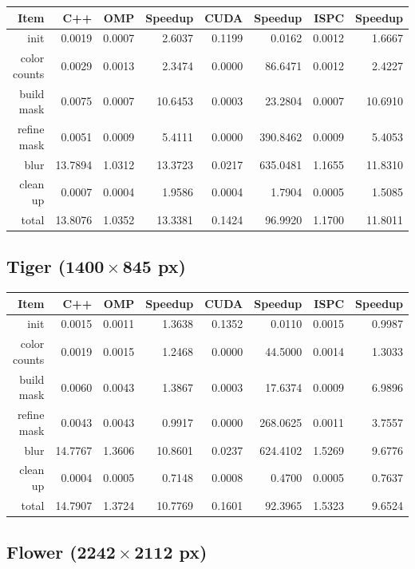 \documentclass[12pt]{article}
\begin{document}
\begin{tabular}{r|r|r|r|r|r|r|r}
    Item & C++ & OMP & Speedup & CUDA & Speedup & ISPC & Speedup
\\  \hline
    init & 0.0019 & 0.0007 & 2.6037 & 0.1199 & 0.0162 & 0.0012 & 1.6667
\\  color counts & 0.0029 & 0.0013 & 2.3474 & 0.0000 & 86.6471 & 0.0012 & 2.4227
\\  build mask & 0.0075 & 0.0007 & 10.6453 & 0.0003 & 23.2804 & 0.0007 & 10.6910
\\  refine mask & 0.0051 & 0.0009 & 5.4111 & 0.0000 & 390.8462 & 0.0009 & 5.4053
\\  blur & 13.7894 & 1.0312 & 13.3723 & 0.0217 & 635.0481 & 1.1655 & 11.8310
\\  clean up & 0.0007 & 0.0004 & 1.9586 & 0.0004 & 1.7904 & 0.0005 & 1.5085
\\  \hline
    total & 13.8076 & 1.0352 & 13.3381 & 0.1424 & 96.9920 & 1.1700 & 11.8011
\end{tabular}

\subsection{Tiger ($\mathbf{1400 \times 845}$ px)}

\begin{tabular}{r|r|r|r|r|r|r|r}
    Item & C++ & OMP & Speedup & CUDA & Speedup & ISPC & Speedup
\\  \hline
    init & 0.0015 & 0.0011 & 1.3638 & 0.1352 & 0.0110 & 0.0015 & 0.9987
\\  color counts & 0.0019 & 0.0015 & 1.2468 & 0.0000 & 44.5000 & 0.0014 & 1.3033
\\  build mask & 0.0060 & 0.0043 & 1.3867 & 0.0003 & 17.6374 & 0.0009 & 6.9896
\\  refine mask & 0.0043 & 0.0043 & 0.9917 & 0.0000 & 268.0625 & 0.0011 & 3.7557
\\  blur & 14.7767 & 1.3606 & 10.8601 & 0.0237 & 624.4102 & 1.5269 & 9.6776
\\  clean up & 0.0004 & 0.0005 & 0.7148 & 0.0008 & 0.4700 & 0.0005 & 0.7637
\\  \hline
    total & 14.7907 & 1.3724 & 10.7769 & 0.1601 & 92.3965 & 1.5323 & 9.6524
\end{tabular}

\subsection{Flower ($\mathbf{2242 \times 2112}$ px)}
\end{document}
